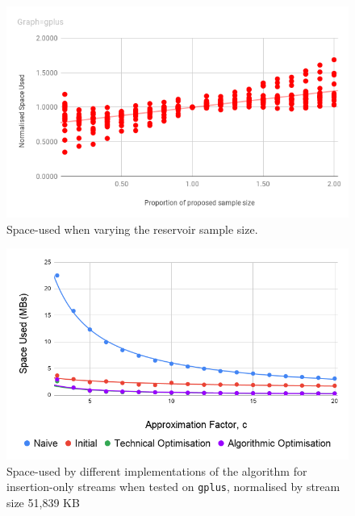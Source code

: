 \documentclass[11pt,twoside,a4paper]{report}
\begin{document}
\begin{figure}
	\label{Figure 10}
	\includegraphics[width=\textwidth]{img/variedSampleSizeSpace.png}
	\caption{Space-used when varying the reservoir sample size.}
\end{figure}
\begin{figure}
	\label{Figure 11}
	\includegraphics[width=\textwidth]{img/insertionOnlyGplusSpace.png}
	\caption{Space-used by different implementations of the algorithm for insertion-only streams when tested on \texttt{gplus}, normalised by stream size 51,839 KB}
\end{figure}
\end{document}

